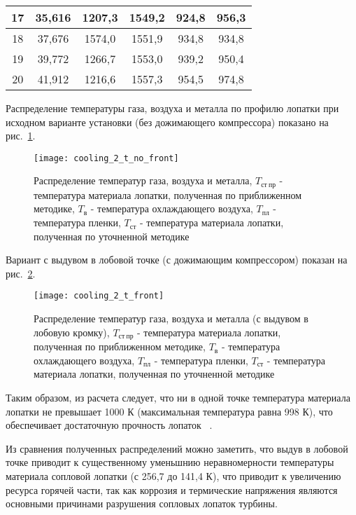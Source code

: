 \begin{enumerate}
\begin{longtable}{|c|c|c|c|c|c|}
			17 & 
			35,616 & 
			1207,3 & 
			1549,2 &
			924,8 & 
			956,3  
			\\\hline
		
			18 & 
			37,676 & 
			1574,0 & 
			1551,9 &
			934,8 & 
			934,8  
			\\\hline
		
			19 & 
			39,772 & 
			1266,7 & 
			1553,0 &
			939,2 & 
			950,4  
			\\\hline
		
			20 & 
			41,912 & 
			1216,6 & 
			1557,3 &
			954,5 & 
			974,8  
			\\\hline
			
		\end{longtable}

\end{enumerate}

Распределение температуры газа, воздуха и металла по профилю лопатки при исходном варианте установки
(без дожимающего компрессора) показано на рис.~\ref{img:cool_gas_parameters_no_front}.
\begin{figure}[H]
    \centering
	\texttt{[image: cooling\_2\_t\_no\_front]}
	\caption{Распределение температур газа, воздуха и металла, $T_{ст \ пр}$ - температура материала лопатки, полученная
	по приближенном методике, $T_в$ - температура охлаждающего воздуха, $T_{пл}$ - температура пленки, $T_{ст}$ -
	температура материала лопатки, полученная по уточненной методике}
	\label{img:cool_gas_parameters_no_front}
\end{figure}

Вариант с выдувом в лобовой точке (с дожимающим компрессором) показан на рис.~\ref{img:cool_gas_parameters_front}.
\begin{figure}[H]
    \centering
	\texttt{[image: cooling\_2\_t\_front]}
	\caption{Распределение температур газа, воздуха и металла (с выдувом в лобовую кромку), $T_{ст \ пр}$ - температура материала лопатки, полученная
	по приближенном методике, $T_в$ - температура охлаждающего воздуха, $T_{пл}$ - температура пленки, $T_{ст}$ -
	температура материала лопатки, полученная по уточненной методике}
	\label{img:cool_gas_parameters_front}
\end{figure}

Таким образом, из расчета следует, что ни в одной точке температура материала лопатки не превышает 1000 К (максимальная температура
равна 998 К), что обеспечивает достаточную прочность лопаток
~\cite{js_36_properties}.

Из сравнения полученных распределений можно заметить, что выдув в лобовой точке приводит к существенному уменьшнию
неравномерности температуры материала сопловой лопатки (с 256,7 до 141,4 К), что приводит к увеличению ресурса горячей
части, так как коррозия и термические напряжения являются основными причинами разрушения сопловых лопаток турбины.